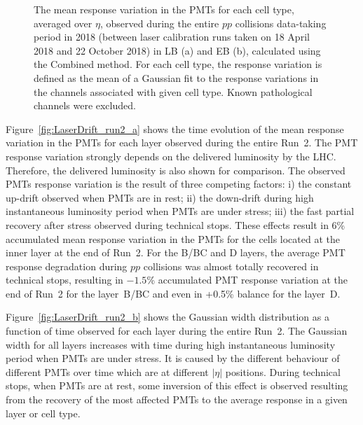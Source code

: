 \begin{figure}[htbp]
\centering
    \hfill
    \caption{The mean response variation in the PMTs for each cell type, averaged over $\eta$, observed during the entire $pp$ collisions data-taking period in 2018 (between laser calibration runs taken on 18 April 2018 and 22 October 2018) in LB (a) and EB (b), calculated using the Combined method. For each cell type, the response variation is defined as the mean of a Gaussian fit to the response variations in the channels associated with given cell type. Known pathological channels were excluded.
    }\label{fig:phimap_2018}
\end{figure}

Figure~\ref{fig:LaserDrift_run2_a} shows the time evolution of the mean response variation in the PMTs for each layer observed during the entire Run~2. The PMT response variation strongly depends on the delivered luminosity by the LHC. Therefore, the delivered luminosity is also shown for comparison. The observed PMTs response variation is the result of three competing factors: i) the constant up-drift observed when PMTs are in rest; ii) the down-drift during high instantaneous luminosity period when PMTs are under stress; iii) the fast partial recovery after stress observed during technical stops. These effects result in 6\% accumulated mean response variation in the PMTs for the cells located at the inner layer at the end of Run~2. For the B/BC and D layers, the average PMT response degradation during $pp$ collisions was almost totally recovered in technical stops, resulting in $-1.5$\% accumulated PMT response variation at the end of Run~2 for the layer~B/BC and even in +0.5\% balance for the layer~D. 

Figure~\ref{fig:LaserDrift_run2_b} shows the Gaussian width distribution as a function of time observed for each layer during the entire Run~2. The Gaussian width for all layers increases with time during high instantaneous luminosity period when PMTs are under stress. It is caused by the different behaviour of different PMTs over time which are at different $|\eta|$ positions. During technical stops, when PMTs are at rest, some inversion of this effect is observed resulting from the recovery of the most affected PMTs to the average response in a given layer or cell type.

